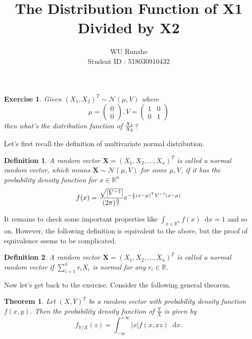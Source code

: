 \documentclass[12pt]{article}
\title{The Distribution Function of X1 Divided by X2}
\author{WU Runzhe\\
	Student ID : 518030910432}
\date{}
\newcommand\bR{\mathbb{R}}
\newcommand\N{\mathcal{N}}
\newcommand*{\dif}{\mathop{}\!\mathrm{d}}
\newtheorem{definition}{Definition}
\newtheorem{theorem}{Theorem}
\newtheorem*{exercise}{Exercise}
\begin{document}
	\maketitle \large
	
	\begin{tcolorbox}
		\begin{exercise}
			Given $(X_1,X_2)^T\sim \N(\mu,V)$ where 
			$$
			\mu = 
			\left(
			\begin{matrix}
			0\\
			0
			\end{matrix}
			\right),
			V=
			\left(
			\begin{matrix}
			1&0\\
			0&1
			\end{matrix}
			\right)
			$$
			then what's the distribution function of $X_1\over X_2$?
		\end{exercise}
	\end{tcolorbox}
	
	Let's first recall the definition of multivariate normal distribution.
	
	\begin{definition}\label{d1}
		A random vector $\textbf{X}=(X_1,X_2,\dots,X_n)^T$ is called a normal random vector, which means $\textbf{X}\sim \N(\mu,V)$ for some $\mu,V$, if it has the probability density function for $x\in \bR^n$
		$$f(x)=\frac{\sqrt{|V^{-1}|}}{(2\pi)^{n\over 2}}e^{-\frac{1}{2}(x-\mu)^TV^{-1}(x-\mu)}$$
	\end{definition}
	
	It remains to check some important properties like $\int_{x\in\bR^n}f(x)\dif x=1$ and so on. However, the following definition is equivalent to the above, but the proof of equivalence seems to be complicated.
	
	\begin{definition}\label{d2}
		A random vector $\textbf{X}=(X_1,X_2,\dots,X_n)^T$ is called a normal random vector if  $\sum_{i=1}^{n}r_i X_i$ is normal for any $r_i\in \bR$.
	\end{definition}

	Now let's get back to the exercise. Consider the following general theorem.
	
	\begin{theorem}\label{t1}
		Let $(X,Y)^T$ be a random vector with probability density function $f(x,y)$. Then the probability density function of $\frac{Y}{X}$ is given by
		$$f_{Y/X}(z)=\int_{-\infty}^{+\infty}|x|f(x,xz)\dif x.$$
	\end{theorem}
\end{document}
